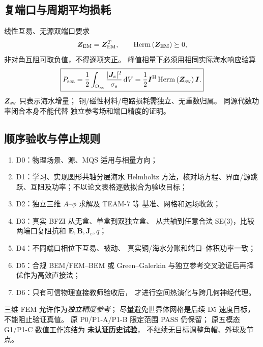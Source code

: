 \subsection{复端口与周期平均损耗}
线性互易、无源双端口要求
\[
 \bm Z_{\rm EM}=\bm Z_{\rm EM}^T,\qquad
 \operatorname{Herm}\left(\bm Z_{\rm EM}\right)\succeq0,
\]
非对角互阻可取负值，不得逐项夹正。
峰值相量下必须用相同实际海水响应验算
\begin{equation}
\boxed{
 P_{\rm sea}=\frac12\int_{\Omega_\infty}
 \frac{|\bm J_e|^2}{\sigma_s}\,\mathrm dV
 =\frac12\bm I^{\mathrm H}
 \operatorname{Herm}\left(\bm Z_{\rm sw}\right)\bm I .
}
\end{equation}
$\bm Z_{\rm sw}$ 只表示海水增量；
铜/磁性材料/电路损耗需独立、无重数归属。
同源代数功率闭合本身不能代替
独立参考场和端口精度的证明。

\subsection{顺序验收与停止规则}
\begin{enumerate}
 \item D0：物理场景、源、MQS 适用与相量方向；
 \item D1：学习、实现圆形共轴分层海水 Helmholtz 方法，核对场方程、界面/源跳跃、互阻及功率；不以论文表格逐数拟合为验收目标；
 \item D2：独立三维 $A$--$\phi$ 求解及 TEAM-7 等
  基准、网格和远场收敛；
 \item D3：真实 BFZI 从无盒、单盒到双独立盒、
  从共轴到任意合法 SE(3)，比较两端口复阻抗和
  $\bm E,\bm B,\bm J_e,q$；
 \item D4：不同端口相位下互易、被动、
  真实铜/海水分账和端口--体积功率一致；
 \item D5：合规 BEM/FEM--BEM 或 Green--Galerkin
  与独立参考交叉验证后再择优作为高效直接法；
 \item D6：只有可信物理直接教师验收后，
  才进行空间热演化与跨几何神经代理。
\end{enumerate}
三维 FEM 允许作为\emph{独立精度参考}；
尽量避免世界体网格是后续 D5 速度目标，
不能阻止验证真值。
原 P0/P1-A/P1-B 限定范围 PASS 仍保留；
原五模态 G1/P1-C 数值工作冻结为
\textbf{未认证历史试验}，
不继续无目标调整角帽、外球及节点。
